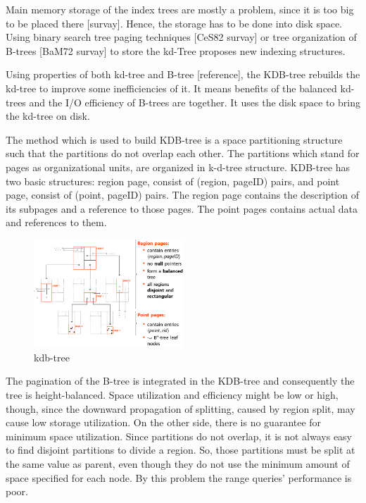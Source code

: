 \documentclass[a4paper,12pt]{article}
\begin{document}
Main memory storage of the index trees are mostly a problem, since it is too big to be placed there  [survay]. Hence, the storage has to be done into disk space. Using binary search tree paging techniques [CeS82 survay] or tree organization of B-trees [BaM72 survay] to store the kd-Tree proposes new indexing structures.

Using properties of both kd-tree and B-tree [reference], the KDB-tree rebuilds the kd-tree to improve some inefficiencies of it.  It means benefits of the balanced kd-trees and the I/O efficiency of B-trees are together. It uses the disk space to bring the kd-tree on disk. 

The method which is used to build  KDB-tree is a space partitioning structure such that the partitions do not overlap each other. The partitions which stand for pages as organizational units, are organized in k-d-tree structure. 
KDB-tree has two basic structures: region page, consist of (region, pageID) pairs, and point page, consist of  (point, pageID) pairs. The region page contains the description of its subpages and a reference to those pages. The point pages contains actual data and references to them. 

\begin{figure}
\centering
\includegraphics[width=0.5\textwidth]{kdbtree}
\caption{kdb-tree}
\label{figkdbtree}
\end{figure}

The pagination of the B-tree is integrated in the KDB-tree and consequently the tree is height-balanced. Space utilization and efficiency might be low or high, though, since the downward propagation of splitting, caused by region split, may cause low storage utilization. On the other side, there is no guarantee for minimum space utilization. Since partitions do not overlap, it is not always easy to find disjoint partitions to divide a region. So, those partitions must be split at the same value as parent, even though they do not use the minimum amount of space specified for each node. By this problem the range queries' performance is poor. 
\end{document}
